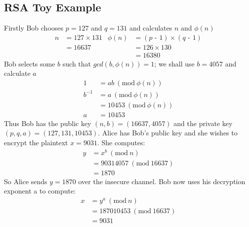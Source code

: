 \documentclass{article}
\theoremstyle{quest}
\newcommand{\mns}{\textrm{ -  }}
\newcommand{\Mod}[1]{\ (\mathrm{mod}\ #1)}
\begin{document}
\subsection{RSA Toy Example}
Firstly Bob chooses $p = 127$ and $q = 131$ and calculates $n$ and $\phi(n)$
\begin{align*}
    n &= 127  \times 131  &\phi(n) &= (p \mns 1) \times (q \mns 1)\\
      &= 16637            &        &= 126        \times 130       \\
      &                   &        &= 16380
\end{align*}
Bob selects some $b$ such that $gcd(b, \phi(n)) = 1$;
we shall use $b = 4057$ and calculate $a$
\begin{align*}
    1      &= ab \Mod{\phi(n)}\\
    b^{-1} &= a \Mod{\phi(n)}\\
           &= 10453 \Mod{\phi(n)}\\
         a &= 10453
\end{align*}
Thus Bob has the public key $(n,b) = (16637,4057)$ and the private key $(p,q,a) = (127, 131, 10453)$.
Alice has Bob’s public key and she wishes to encrypt the plaintext $x = 9031$.
She computes:
\begin{align*}
   y &= x^b \Mod{n} \\
     &= 90314057 \Mod{16637} \\
     &= 1870
\end{align*}
So Alice sends $y = 1870$ over the insecure channel. Bob now uses his decryption exponent a to compute:
\begin{align*}
   x &= y^a \Mod{n} \\
     &= 187010453 \Mod{16637} \\
     &= 9031
\end{align*}
\end{document}
